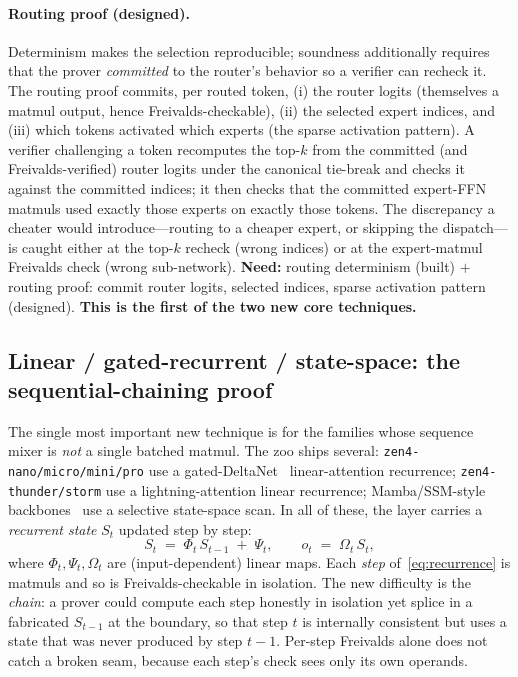 \paragraph{Routing proof (designed).} Determinism makes the selection reproducible;
soundness additionally requires that the prover \emph{committed} to the router's behavior
so a verifier can recheck it. The routing proof commits, per routed token, (i) the router
logits (themselves a matmul output, hence Freivalds-checkable), (ii) the selected expert
indices, and (iii) which tokens activated which experts (the sparse activation pattern).
A verifier challenging a token recomputes the top-$k$ from the committed (and
Freivalds-verified) router logits under the canonical tie-break and checks it against the
committed indices; it then checks that the committed expert-FFN matmuls used exactly
those experts on exactly those tokens. The discrepancy a cheater would introduce---routing
to a cheaper expert, or skipping the dispatch---is caught either at the top-$k$ recheck
(wrong indices) or at the expert-matmul Freivalds check (wrong sub-network). \textbf{Need:}
routing determinism (built) $+$ routing proof: commit router logits, selected indices,
sparse activation pattern (designed). \textbf{This is the first of the two new core
techniques.}

\subsection{Linear / gated-recurrent / state-space: the sequential-chaining proof}
\label{sec:ssm-proof}

The single most important new technique is for the families whose sequence mixer is
\emph{not} a single batched matmul. The \Zoo{} zoo ships several:
\texttt{zen4-nano/micro/mini/pro} use a gated-DeltaNet~\cite{yang2024deltanet}
linear-attention recurrence; \texttt{zen4-thunder/storm} use a lightning-attention linear
recurrence; Mamba/SSM-style backbones~\cite{gu2023mamba} use a selective state-space scan. In all of these, the layer carries a
\emph{recurrent state} $S_t$ updated step by step:
\begin{equation}
\label{eq:recurrence}
S_t \;=\; \Phi_t\, S_{t-1} \;+\; \Psi_t,
\qquad
o_t \;=\; \Omega_t\, S_t,
\end{equation}
where $\Phi_t,\Psi_t,\Omega_t$ are (input-dependent) linear maps. Each \emph{step}
of~\eqref{eq:recurrence} is matmuls and so is Freivalds-checkable in isolation. The new
difficulty is the \emph{chain}: a prover could compute each step honestly in isolation yet
splice in a fabricated $S_{t-1}$ at the boundary, so that step $t$ is internally
consistent but uses a state that was never produced by step $t-1$. Per-step Freivalds
alone does not catch a broken seam, because each step's check sees only its own operands.

